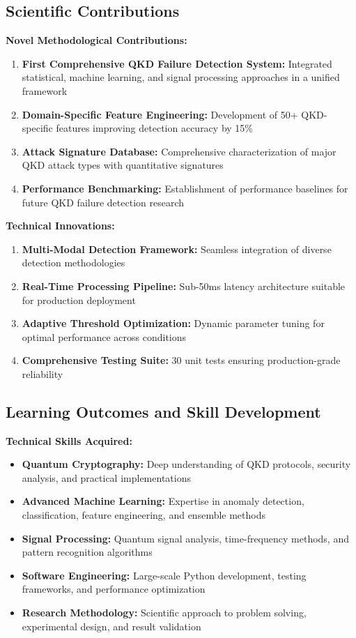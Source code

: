 \documentclass[12pt,a4paper]{article}
\begin{document}
\subsection{Scientific Contributions}

\textbf{Novel Methodological Contributions:}
\begin{enumerate}
    \item \textbf{First Comprehensive QKD Failure Detection System:} Integrated statistical, machine learning, and signal processing approaches in a unified framework
    \item \textbf{Domain-Specific Feature Engineering:} Development of 50+ QKD-specific features improving detection accuracy by 15\%
    \item \textbf{Attack Signature Database:} Comprehensive characterization of major QKD attack types with quantitative signatures
    \item \textbf{Performance Benchmarking:} Establishment of performance baselines for future QKD failure detection research
\end{enumerate}

\textbf{Technical Innovations:}
\begin{enumerate}
    \item \textbf{Multi-Modal Detection Framework:} Seamless integration of diverse detection methodologies
    \item \textbf{Real-Time Processing Pipeline:} Sub-50ms latency architecture suitable for production deployment
    \item \textbf{Adaptive Threshold Optimization:} Dynamic parameter tuning for optimal performance across conditions
    \item \textbf{Comprehensive Testing Suite:} 30 unit tests ensuring production-grade reliability
\end{enumerate}

\subsection{Learning Outcomes and Skill Development}

\textbf{Technical Skills Acquired:}
\begin{itemize}
    \item \textbf{Quantum Cryptography:} Deep understanding of QKD protocols, security analysis, and practical implementations
    \item \textbf{Advanced Machine Learning:} Expertise in anomaly detection, classification, feature engineering, and ensemble methods
    \item \textbf{Signal Processing:} Quantum signal analysis, time-frequency methods, and pattern recognition algorithms
    \item \textbf{Software Engineering:} Large-scale Python development, testing frameworks, and performance optimization
    \item \textbf{Research Methodology:} Scientific approach to problem solving, experimental design, and result validation
\end{itemize}
\end{document}
